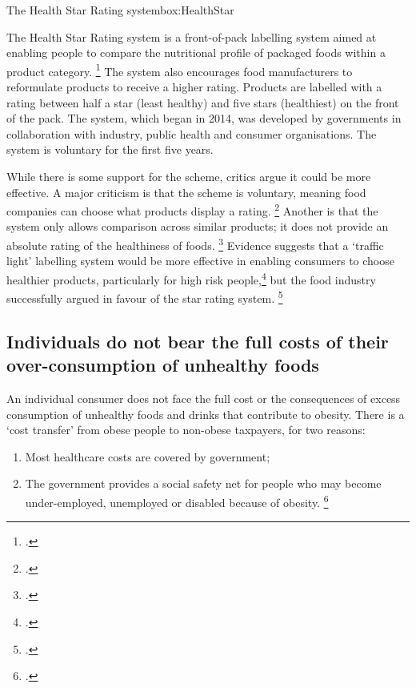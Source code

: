\documentclass[embargoed]{grattan}
\begin{document}
\begin{smallbox}{The Health Star Rating system}{box:HealthStar}

The Health Star Rating system is a front-of-pack labelling system aimed at enabling people to compare the nutritional profile of packaged foods within a product category.%
\footcite{System2014HealthStarRatings} The system also encourages food manufacturers to reformulate products to receive a higher rating.
Products are labelled with a rating between half a star (least healthy) and five stars (healthiest) on the front of the pack. The system, which began in 2014, was developed by governments in collaboration with industry, public health and consumer organisations.
The system is voluntary for the first five years.

While there is some support for the scheme, critics argue it could be more effective.
A major criticism is that the scheme is voluntary, meaning food companies can choose what products display a rating.%
\footcite{Clemons2015Howusehealth} Another is that the system only allows comparison across similar products; it does not provide an absolute rating of the healthiness of foods.%
\footcites{Lawrence2015yearonAustralias}{Clemons2015Howusehealth} Evidence suggests that a `traffic light' labelling system would be more effective in enabling consumers to choose healthier products, particularly for high risk people,\footcites{Hawley2013sciencefrontpackage}{Kelly2008Frontpackfood}{Mejean2014Associationperceptionfront}{Turner2014Afterthreeyear} but the food industry successfully argued in favour of the star rating system.%
\footcites{Sacks2011Statesshouldstand}{Gill2011Foodindustrydigs}{Turner2014Afterthreeyear}
\end{smallbox}

\subsection{Individuals do not bear the full costs of their over-consumption of unhealthy foods}\label{individuals-do-not-bear-the-full-costs-of-their-over-consumption-of-unhealthy-foods}

An individual consumer does not face the full cost or the consequences of excess consumption of unhealthy foods and drinks that contribute to obesity.
There is a `cost transfer' from obese people to non-obese taxpayers, for two reasons: 

\begin{enumerate}
\item Most healthcare costs are covered by government; 
\item The government provides a social safety net for people who may become under-employed, unemployed or disabled because of obesity.%
\footcites{Karnani2016ObesityCrisisas}{Freebairn2010Taxationobesity}{Koplan2010Responsefoodbeverage}{Brownell2009Ouncespreventionthepublic}{Commission2010ChildhoodObesityEconomic}
\end{enumerate}
\end{document}
